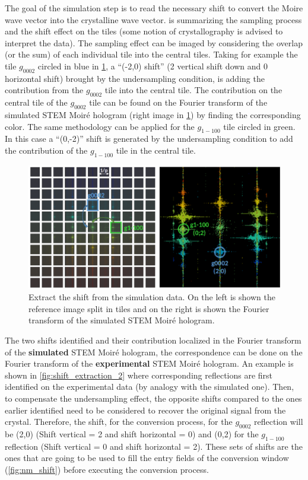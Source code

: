 \documentclass[12pt, titlepage]{article}
\begin{document}
The goal of the simulation step is to read the necessary shift to convert the Moire wave vector into the crystalline wave vector.  is summarizing the sampling process and the shift effect on the tiles (some notion of crystallography is advised to interpret the data). The sampling effect can be imaged by considering the overlap (or the sum) of each individual tile into the central tiles. Taking for example the tile $g_{0002}$ circled in blue in \cref{fig:shift_extraction}, a \enquote{(-2,0) shift} (2 vertical shift down and 0 horizontal shift) brought by the undersampling condition, is adding the contribution from the $g_{0002}$ tile into the central tile. The contribution on the central tile of the $g_{0002}$ tile can be found on the Fourier transform of the simulated STEM Moir{\'e} hologram (right image in \cref{fig:shift_extraction}) by finding the corresponding color. The same methodology can be applied for the $g_{1-100}$ tile circled in green. In this case a \enquote{(0,-2)} shift is generated by the undersampling condition to add the contribution of the $g_{1-100}$ tile in the central tile.

\begin{figure}[H]
\centering
\includegraphics[scale=0.5]{Figures/Read_simulation.png}
\caption{Extract the shift from the simulation data. On the left is shown the reference image split in tiles and on the right is shown the Fourier transform of the simulated STEM Moir{\'e} hologram.}
\label{fig:shift_extraction}
\end{figure}

The two shifts identified and their contribution localized in the Fourier transform of the \textbf{simulated} STEM Moir{\'e} hologram, the correspondence can be done on the Fourier transform of the \textbf{experimental} STEM Moir{\'e} hologram. An example is shown in \cref{fig:shift_extraction_2} where corresponding reflections are first identified on the experimental data (by analogy with the simulated one). Then, to compensate the undersampling effect, the opposite shifts compared to the ones earlier identified need to be considered to recover the original signal from the crystal. Therefore, the shift, for the conversion process, for the $g_{0002}$ reflection will be (2,0) (Shift vertical = 2 and shift horizontal = 0) and (0,2) for the $g_{1-100}$ reflection (Shift vertical = 0 and shift horizontal = 2). These sets of shifts are the ones that are going to be used to fill the entry fields of the conversion window (\cref{fig:nm_shift}) before executing the conversion process.
\end{document}
